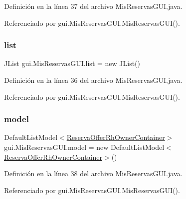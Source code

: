 Definición en la línea 37 del archivo Mis\+Reservas\+G\+U\+I.\+java.



Referenciado por gui.\+Mis\+Reservas\+G\+U\+I.\+Mis\+Reservas\+G\+U\+I().

\mbox{\label{classgui_1_1_mis_reservas_g_u_i_a57d28f9e9e4ecff5c08b348934a72bc6}} 
\subsubsection{\texorpdfstring{list}{list}}
{\footnotesize\ttfamily J\+List gui.\+Mis\+Reservas\+G\+U\+I.\+list = new J\+List()\hspace{0.3cm}{\ttfamily [private]}}



Definición en la línea 36 del archivo Mis\+Reservas\+G\+U\+I.\+java.



Referenciado por gui.\+Mis\+Reservas\+G\+U\+I.\+Mis\+Reservas\+G\+U\+I().

\mbox{\label{classgui_1_1_mis_reservas_g_u_i_a7d1ff262cc15c57867d6613100ad54fe}} 
\subsubsection{\texorpdfstring{model}{model}}
{\footnotesize\ttfamily Default\+List\+Model$<$\mbox{\hyperlink{classdomain_1_1_reserva_offer_rh_owner_container}{Reserva\+Offer\+Rh\+Owner\+Container}}$>$ gui.\+Mis\+Reservas\+G\+U\+I.\+model = new Default\+List\+Model$<$\mbox{\hyperlink{classdomain_1_1_reserva_offer_rh_owner_container}{Reserva\+Offer\+Rh\+Owner\+Container}}$>$()\hspace{0.3cm}{\ttfamily [private]}}



Definición en la línea 38 del archivo Mis\+Reservas\+G\+U\+I.\+java.



Referenciado por gui.\+Mis\+Reservas\+G\+U\+I.\+Mis\+Reservas\+G\+U\+I().

\mbox{\label{classgui_1_1_mis_reservas_g_u_i_a8901fbadd3ea86c48507ead16452fba5}} 
